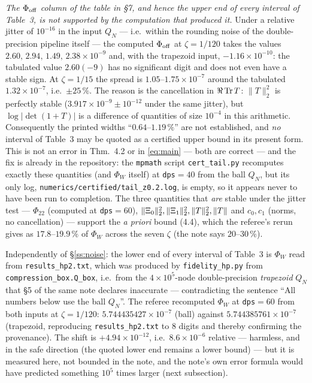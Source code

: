 \documentclass[11pt]{article}
\begin{document}
\begin{verdictbreak}
\emph{The $\Phi_{\rm off}$ column of the table in \S7, and hence the upper end of every interval of
Table~3, is not supported by the computation that produced it.}  Under a relative jitter of
$10^{-16}$ in the input $Q_N$ --- i.e.\ within the rounding noise of the double-precision pipeline
itself --- the computed $\Phi_{\rm off}$ at $\zeta=1/120$ takes the values
$2.60,\,2.94,\,1.49,\,2.38\times10^{-9}$ and, with the trapezoid input, $-1.16\times10^{-10}$: the
tabulated value $2.60(-9)$ has no significant digit and does not even have a stable sign.  At
$\zeta=1/15$ the spread is $1.05$--$1.75\times10^{-7}$ around the tabulated $1.32\times10^{-7}$,
i.e.\ $\pm25\,\%$.  The reason is the cancellation in $\Re\operatorname{Tr} T$: $\|T\|_2^2$ is perfectly stable
($3.917\times10^{-9}\pm10^{-12}$ under the same jitter), but $\log|\det(1+T)|$ is a difference of
quantities of size $10^{-4}$ in this arithmetic.  Consequently the printed widths
``$0.64$--$1.19\,\%$'' are not established, and \emph{no} interval of Table~3 may be quoted as a
certified upper bound in its present form.  This is not an error in Thm.~4.2 or in
\eqref{eq:main} --- both are correct --- and the fix is already in the repository: the
\texttt{mpmath} script \texttt{cert\_tail.py} recomputes exactly these quantities (and $\Phi_W$
itself) at \texttt{dps}$=40$ from the ball $Q_N$, but its only log,
\texttt{numerics/certified/tail\_z0.2.log}, is empty, so it appears never to have been run to
completion.  The three quantities that \emph{are} stable under the jitter test --- $\Phi_{22}$
(computed at \texttt{dps}$=60$), $\|\Xi_0\|_2^2,\|\Xi_1\|_2^2,\|T\|_2^2,\|T\|$ and $c_0,c_1$ (norms, no
cancellation) --- support the \emph{a priori} bound (4.4), which the referee's rerun gives as
$17.8$--$19.9\,\%$ of $\Phi_W$ across the seven $\zeta$ (the note says $20$--$30\,\%$).
\end{verdictbreak}

\begin{verdictgap}
Independently of \S\ref{ss:noise}: the lower end of every interval of Table~3 is
$\Phi_W$ read from \texttt{results\_hp2.txt}, which was produced by \texttt{fidelity\_hp.py} from
\texttt{compression\_box.Q\_box}, i.e.\ from the $4\times10^5$-node double-precision \emph{trapezoid}
$Q_N$ that \S5 of the same note declares inaccurate --- contradicting the sentence ``All numbers
below use the ball $Q_N$''.  The referee recomputed $\Phi_W$ at \texttt{dps}$=60$ from both inputs at
$\zeta=1/120$: $5.744435427\times10^{-7}$ (ball) against $5.744385761\times10^{-7}$ (trapezoid,
reproducing \texttt{results\_hp2.txt} to $8$ digits and thereby confirming the provenance).  The
shift is $+4.94\times10^{-12}$, i.e.\ $8.6\times10^{-6}$ relative --- harmless, and in the safe
direction (the quoted lower end remains a lower bound) --- but it is measured here, not bounded in
the note, and the note's own error formula would have predicted something $10^5$ times larger
(next subsection).
\end{verdictgap}
\end{document}
